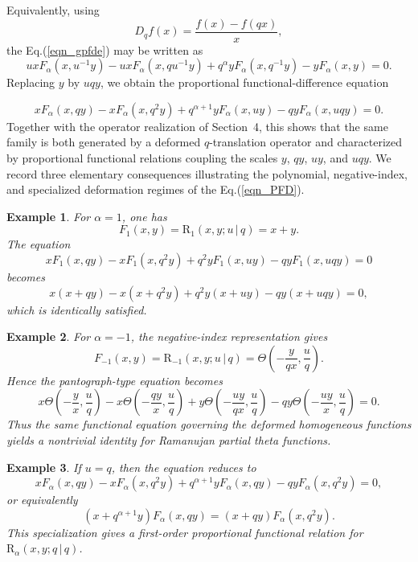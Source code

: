 \documentclass[12pt]{article}
\newcommand{\rr}{\mathrm{R}}
\newtheorem{example}{Example}
\begin{document}
Equivalently, using
\[
D_qf(x)=\frac{f(x)-f(qx)}{x},
\]
the Eq.(\ref{eqn_gpfde}) may be written as
\[
uxF_\alpha(x,u^{-1}y)-uxF_\alpha(x,qu^{-1}y)
+
q^\alpha yF_\alpha(x,q^{-1}y)
-
yF_\alpha(x,y)
=
0.
\]
Replacing \(y\) by \(uqy\), we obtain the proportional
functional-difference equation

\begin{equation}\label{eqn_PFD}
xF_\alpha(x,qy)-xF_\alpha(x,q^2y)
+
q^{\alpha+1}yF_\alpha(x,uy)
-
qyF_\alpha(x,uqy)
=
0.
\end{equation}
Together with the operator realization of Section~4, this shows that the same family is both generated by a deformed \(q\)-translation operator and characterized by proportional functional relations coupling the scales \(y\), \(qy\), \(uy\), and \(uqy\). We record three elementary consequences illustrating the polynomial, negative-index, and specialized deformation regimes of the Eq.(\ref{eqn_PFD}).
\begin{example}
For \(\alpha=1\), one has
\[
F_1(x,y)=\rr_1(x,y;u\,|\,q)=x+y.
\]
The equation
\[
xF_1(x,qy)-xF_1(x,q^2y)+q^2yF_1(x,uy)-qyF_1(x,uqy)=0
\]
becomes
\[
x(x+qy)-x(x+q^2y)+q^2y(x+uy)-qy(x+uqy)=0,
\]
which is identically satisfied.
\end{example}

\begin{example}
For \(\alpha=-1\), the negative-index representation gives
\[
F_{-1}(x,y)
=
\rr_{-1}(x,y;u\,|\,q)
=
\Theta\left(-\frac{y}{qx},\frac{u}{q}\right).
\]
Hence the pantograph-type equation becomes
\[
x\Theta\left(-\frac{y}{x},\frac{u}{q}\right)
-
x\Theta\left(-\frac{qy}{x},\frac{u}{q}\right)
+
y\Theta\left(-\frac{uy}{qx},\frac{u}{q}\right)
-
qy\Theta\left(-\frac{uy}{x},\frac{u}{q}\right)
=0.
\]
Thus the same functional equation governing the deformed homogeneous
functions yields a nontrivial identity for Ramanujan partial theta
functions.
\end{example}

\begin{example}
If \(u=q\), then the equation reduces to
\[
xF_\alpha(x,qy)-xF_\alpha(x,q^2y)
+
q^{\alpha+1}yF_\alpha(x,qy)
-
qyF_\alpha(x,q^2y)=0,
\]
or equivalently
\begin{equation}\label{eqn_prod_alpha}
(x+q^{\alpha+1}y)F_\alpha(x,qy)
=
(x+qy)F_\alpha(x,q^2y).
\end{equation}
This specialization gives a first-order proportional functional
relation for \(\rr_\alpha(x,y;q\,|\,q)\).
\end{example}
\end{document}
